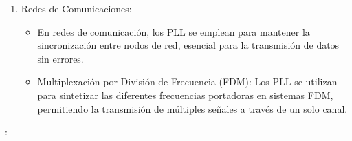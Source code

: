 \begin{enumerate} [label={\arabic*)}]
\begin{enumerate}
\begin{itemize}
        \end{itemize}
        \item Redes de Comunicaciones:
        \begin{itemize}
            \item En redes de comunicación, los PLL se emplean para mantener la sincronización entre nodos de red, esencial para la transmisión de datos sin errores.
            \item Multiplexación por División de Frecuencia (FDM): Los PLL se utilizan para sintetizar las diferentes frecuencias portadoras en sistemas FDM, permitiendo la transmisión de múltiples señales a través de un solo canal.
        \end{itemize}
    \end{enumerate}:
\end{enumerate}